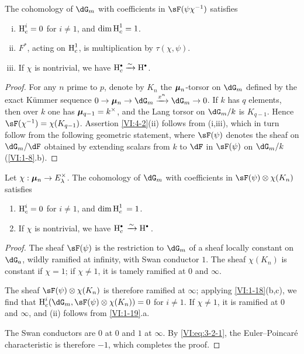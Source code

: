 \begin{proposition_}\label{VI:4-2}
The cohomology of $\dG_m$ with coefficients in $\sF(\psi\chi^{-1})$ satisfies 
\begin{enumerate}[(i)]
  \item $\operatorname{H}_c^i=0$ for $i\ne 1$, and $\dim \operatorname{H}_c^1=1$. 
  \item $F^\ast$, acting on $\operatorname{H}_c^1$, is multiplication by 
    $\tau(\chi,\psi)$. 
  \item If $\chi$ is nontrivial, we have $\h_c^\bullet \iso \h^\bullet$. 
\end{enumerate}
\end{proposition_}
\begin{proof}[Proof]
For any $n$ prime to $p$, denote by $K_n$ the ${\bm\mu}_n$-torsor on $\dG_m$ 
defined by the exact K\"ummer sequence 
$0 \to \dmu_n \to \dG_m \xrightarrow{x^n} \dG_m \to 0$. If $k$ has $q$ 
elements, then over $k$ one has ${\bm\mu}_{q-1}=k^\times$, and the Lang torsor on 
$\dG_m/k$ is $K_{q-1}$. Hence $\sF(\chi^{-1})=\chi(K_{q-1})$. 
Assertion \ref{VI:4-2}(ii) follows from (i,iii), which in turn follow from 
the following geometric statement, where $\sF(\psi)$ denotes the sheaf 
on $\dG_m/\dF$ obtained by extending scalars from $k$ to $\dF$ in 
$\sF(\psi)$ on $\dG_m/k$ (\ref{VI:1-8}.b). 
\end{proof}





\begin{proposition_}\label{VI:4-3}
Let $\chi:{\bm\mu}_n \to E_\lambda^\times$. The cohomology of $\dG_m$ with 
coefficients in $\sF(\psi)\otimes \chi(K_n)$ satisfies 
\begin{enumerate}[\indent (i)]
  \item $\operatorname{H}_c^i=0$ for $i\ne 1$, and $\dim \operatorname{H}_c^1{} = 1$. 
  \item If $\chi$ is nontrivial, we have $\h_c^\bullet{}\iso \h^\bullet{}$. 
\end{enumerate}
\end{proposition_}
\begin{proof}[Proof]
The sheaf $\sF(\psi)$ is the restriction to $\dG_m$ of a sheaf locally 
constant on $\dG_a$, wildly ramified at infinity, with Swan conductor 
$1$. The sheaf $\chi(K_n)$ is constant if $\chi=1$; if $\chi\ne 1$, it 
is tamely ramified at $0$ and $\infty$. 

The sheaf $\sF(\psi)\otimes\chi(K_n)$ is therefore ramified at $\infty$; 
applying \ref{VI:1-18}(b,c), we find that 
$\h_c^i(\dG_m,\sF(\psi)\otimes \chi(K_n))=0$ for $i\ne 1$. If $\chi\ne 1$, it 
is ramified at $0$ and $\infty$, and (ii) follows from \ref{VI:1-19}.a. 

The Swan conductors are $0$ at $0$ and $1$ at $\infty$. By 
\eqref{VI:eq:3-2-1}, the Euler--Poincaré characteristic is therefore $-1$, 
which completes the proof. 
\end{proof}





